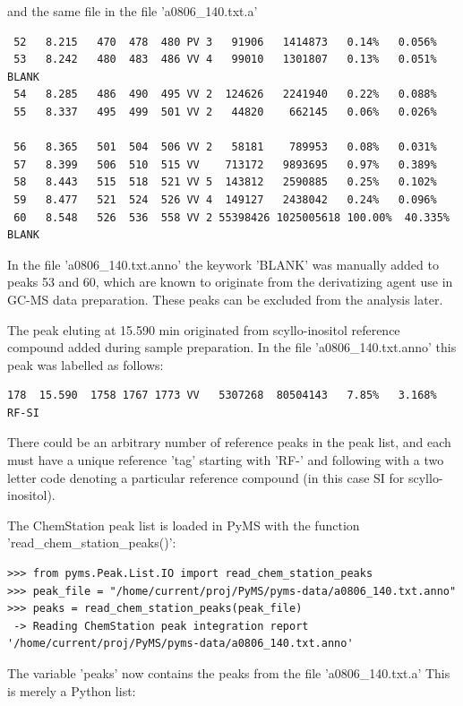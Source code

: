 \noindent
and the same file in the file 'a0806\_140.txt.a'

\begin{verbatim}
 52   8.215   470  478  480 PV 3   91906   1414873   0.14%   0.056%
 53   8.242   480  483  486 VV 4   99010   1301807   0.13%   0.051% BLANK
 54   8.285   486  490  495 VV 2  124626   2241940   0.22%   0.088%
 55   8.337   495  499  501 VV 2   44820    662145   0.06%   0.026%
 
 56   8.365   501  504  506 VV 2   58181    789953   0.08%   0.031%
 57   8.399   506  510  515 VV    713172   9893695   0.97%   0.389%
 58   8.443   515  518  521 VV 5  143812   2590885   0.25%   0.102%
 59   8.477   521  524  526 VV 4  149127   2438042   0.24%   0.096%
 60   8.548   526  536  558 VV 2 55398426 1025005618 100.00%  40.335% BLANK
\end{verbatim}

\noindent
In the file 'a0806\_140.txt.anno' the keywork 'BLANK' was manually added to peaks
53 and 60, which are known to originate from the derivatizing agent use in GC-MS
data preparation.  These peaks can be excluded from the analysis later.

The peak eluting at 15.590 min originated from scyllo-inositol reference
compound added during sample preparation. In the file 'a0806\_140.txt.anno'
this peak was labelled as follows:

\begin{verbatim}
178  15.590  1758 1767 1773 VV   5307268  80504143   7.85%   3.168% RF-SI
\end{verbatim}

\noindent
There could be an arbitrary number of reference peaks in the peak list, and each
must have a unique reference 'tag' starting with 'RF-' and following with a two
letter code denoting a particular reference compound (in this case SI for
scyllo-inositol).

The ChemStation peak list is loaded in PyMS with the function
'read\_chem\_station\_peaks()':

\begin{verbatim}
>>> from pyms.Peak.List.IO import read_chem_station_peaks
>>> peak_file = "/home/current/proj/PyMS/pyms-data/a0806_140.txt.anno"
>>> peaks = read_chem_station_peaks(peak_file)
 -> Reading ChemStation peak integration report
'/home/current/proj/PyMS/pyms-data/a0806_140.txt.anno'
\end{verbatim}

\noindent
The variable 'peaks' now contains the peaks from the file 'a0806\_140.txt.a'
This is merely a Python list:

